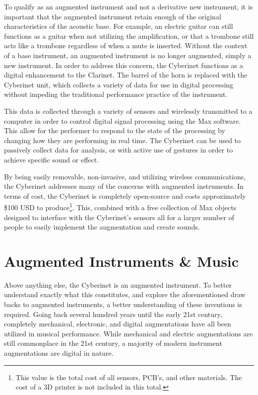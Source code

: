 To qualify as an augmented instrument and not a derivative new instrument, it is important that the augmented instrument retain enough of the original characteristics of the acoustic base\cite{miranda_Wanderley_instrumentControl_2006}. For example, an electric guitar can still functions as a guitar when not utilizing the amplification, or that a trombone still acts like a trombone regardless of when a mute is inserted. Without the context of a base instrument, an augmented instrument is no longer augmented, simply a new instrument. In order to address this concern, the Cyberinet functions as a digital enhancement to the Clarinet. The barrel of the horn is replaced with the Cyberinet unit, which collects a variety of data for use in digital processing without impeding the traditional performance practice of the instrument.

This data is collected through a variety of sensors and wirelessly transmitted to a computer in order to control digital signal processing using the Max software. This allow for the performer to respond to the state of the processing by changing how they are performing in real time. The Cyberinet can be used to passively collect data for analysis, or with active use of gestures in order to achieve specific sound or effect.

By being easily removable, non-invasive, and utilizing wireless communications, the Cyberinet addresses many of the concerns with augmented instruments. In terms of cost, the Cyberinet is completely open-source and costs approximately \$100 USD to produce\footnote{This value is the total cost of all sensors, PCB's, and other materials. The cost of a 3D printer is not included in this total.}. This, combined with a free collection of Max objects designed to interface with the Cyberinet's sensors all for a larger number of people to easily implement the augmentation and create sounds.

\section{Augmented Instruments \& Music}


Above anything else, the Cyberinet is an augmented instrument. To better understand exactly what this constitutes, and explore the aforementioned draw backs to augmented instruments, a better understanding of these inventions is required. Going back several hundred years until the early 21st century, completely mechanical, electronic, and digital augmentations have all been utilized in musical performance. While mechanical and electric augmentations are still commonplace in the 21st century, a majority of modern instrument augmentations are digital in nature.


